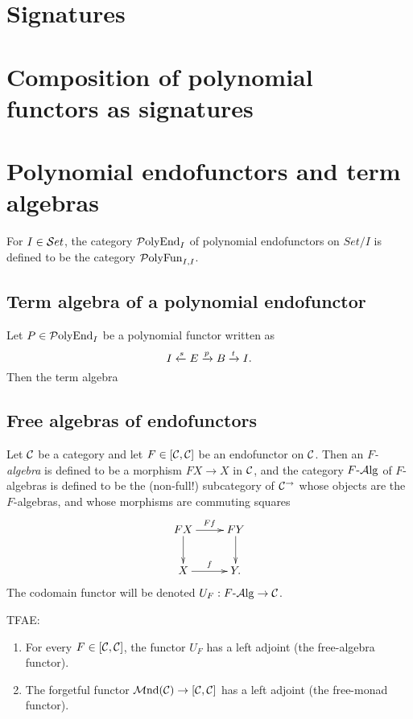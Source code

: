 \newcommand{\PolyEnd}{{\mathrm{\cP olyEnd}}}
\newcommand{\PolyFun}{{\mathrm{\cP olyFun}}}
\newcommand{\PolyMnd}{{\mathrm{\cP olyMnd}}}

\section{Signatures}
\section{Composition of polynomial functors as signatures}

\section{Polynomial endofunctors and term algebras}
For $I\in{\mathcal{S} et}$, the category $\PolyEnd_I$ of polynomial endofunctors on $Set/I$
is defined to be the category $\PolyFun_{I,I}$.

\subsection{Term algebra of a polynomial endofunctor}
Let $P\in\PolyEnd_I$ be a polynomial functor written as
\[
    I\xleftarrow {s} E\xrightarrow {p} B\xrightarrow {t} I.
\]
Then the term algebra

\subsection{Free algebras of endofunctors}
Let $\mathcal{C}$ be a category and let $F\in [\mathcal{C},\mathcal{C}]$ be an endofunctor on $\mathcal{C}$.
Then an \emph{$F$-algebra} is defined to be a morphism $FX\to X$ in $\mathcal{C}$, and
the category $F{\text{-} \mathrm{\mathcal{A} lg}}$ of $F$-algebras is defined to be the (non-full!) subcategory of
$\mathcal{C}^\rightarrow$ whose objects are the $F$-algebras, and whose morphisms are commuting
squares
\[
    \xymatrix{
      FX \ar[d]\ar[r]^{Ff}
      &FY\ar[d]\\
      X\ar[r]^f
      &Y.
    }
\]
The codomain functor will be denoted
$U_F:F{\text{-} \mathrm{\mathcal{A} lg}}\to\mathcal{C}$.

\begin{theorem} \label{thm:free-monad}
    TFAE:
    \begin{enumerate}
    \item For every $F\in[\mathcal{C},\mathcal{C}]$, the functor $U_F$ has a left adjoint (the
        free-algebra functor).
    \item The forgetful functor ${\mathrm{\mathcal{M} nd}}(\mathcal{C})\to[\mathcal{C},\mathcal{C}]$ has a left adjoint (the
        free-monad functor).
    \end{enumerate}
\end{theorem}


